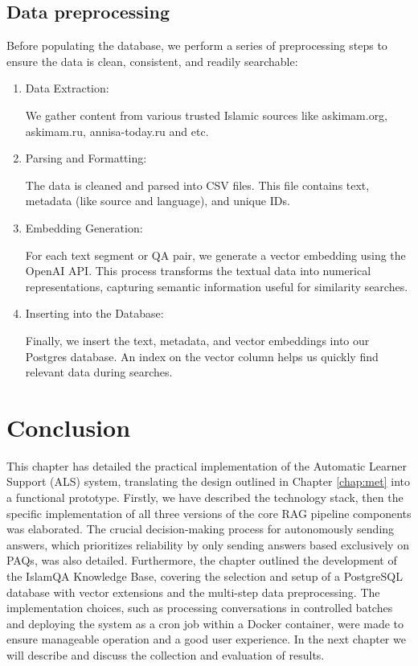 \subsection{Data preprocessing}
Before populating the database, we perform a series of preprocessing steps to ensure the data is clean, consistent, and readily searchable:
\begin{enumerate}
    \item Data Extraction:
    
    We gather content from various trusted Islamic sources like askimam.org,  askimam.ru, annisa-today.ru and etc.

    \item Parsing and Formatting:
    
    The data is cleaned and parsed into CSV files. This file contains text, metadata (like source and language), and unique IDs.
    
    
    \item Embedding Generation:
    
    For each text segment or QA pair, we generate a vector embedding using the OpenAI API. This process transforms the textual data into numerical representations, capturing semantic information useful for similarity searches.
    
    \item Inserting into the Database:
    
    Finally, we insert the text, metadata, and vector embeddings into our Postgres database. An index on the vector column helps us quickly find relevant data during searches.
\end{enumerate}

\section{Conclusion}

This chapter has detailed the practical implementation of the Automatic Learner Support (ALS) system, translating the design outlined in Chapter \ref{chap:met} into a functional prototype. Firstly, we have described the technology stack, then the specific implementation of all three versions of the core RAG pipeline components was elaborated. The crucial decision-making process for autonomously sending answers, which prioritizes reliability by only sending answers based exclusively on PAQs, was also detailed.
Furthermore, the chapter outlined the development of the IslamQA Knowledge Base, covering the selection and setup of a PostgreSQL database with vector extensions and the multi-step data preprocessing. The implementation choices, such as processing conversations in controlled batches and deploying the system as a cron job within a Docker container, were made to ensure manageable operation and a good user experience.
In the next chapter we will describe and discuss the collection and evaluation of results.
